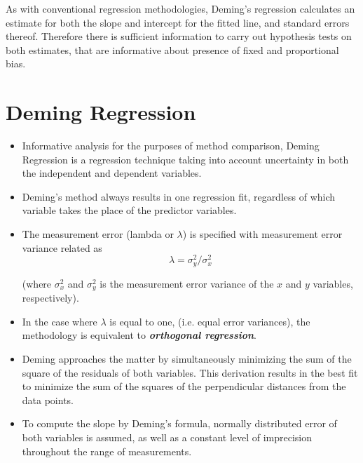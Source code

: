 \documentclass[MAIN.tex]{subfiles}
\begin{document}
\bigskip
	
	As with conventional regression methodologies, Deming's regression
	calculates an estimate for both the slope and intercept for the
	fitted line, and standard errors thereof. Therefore there is
	sufficient information to carry out hypothesis tests on both
	estimates, that are informative about presence of fixed and
	proportional bias.
	

\bigskip


	


	

	\section*{Deming Regression}
	
	\begin{itemize}
		\item Informative analysis for the purposes of method comparison, Deming Regression is a regression technique taking into account uncertainty in both the independent and dependent variables.
		
		\item Deming’s method always results in one regression fit, regardless of which variable takes the place of the predictor variables.
		
		
		
		\item The measurement error (lambda or $\lambda$) is specified with measurement error variance related as 
		\[\lambda = \sigma^2_y/\sigma^2_x\]
		
		(where $\sigma^2_x$ and $\sigma^2_y$ is the measurement error variance of the $x$ and $y$ variables, respectively).
		
		\item In the case where $\lambda$ is equal to one, (i.e. equal error variances), the methodology is equivalent to \textit{\textbf{orthogonal regression}}.
		
		\item Deming approaches the matter by simultaneously minimizing the sum of the square of the residuals of both variables. This derivation results in the best fit to minimize the sum of the squares of the perpendicular distances from the data points.
		
		\item To compute the slope by Deming’s formula,  normally distributed error of both variables  is assumed, as well as a constant level of imprecision throughout the range of measurements.
		
	\end{itemize}
	
\end{document}

